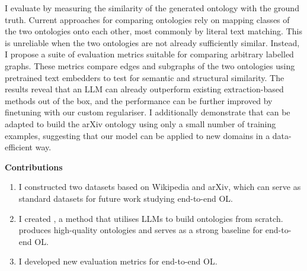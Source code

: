 I evaluate \name by measuring the similarity of the generated ontology with the ground truth. Current approaches for comparing ontologies rely on mapping classes of the two ontologies onto each other, most commonly by literal text matching.  This is unreliable when the two ontologies are not already sufficiently similar. Instead, I propose a suite of evaluation metrics suitable for comparing arbitrary labelled graphs. These metrics compare edges and subgraphs of the two ontologies using pretrained text embedders to test for semantic and structural similarity. The results reveal that an LLM can already outperform existing extraction-based methods out of the box, and the performance can be further improved by finetuning with our custom regulariser. I additionally demonstrate that \name can be adapted to build the arXiv ontology using only a small number of training examples, suggesting that our model can be applied to new domains in a data-efficient way.

\textbf{Contributions}
\begin{enumerate}
    \item I constructed two datasets based on Wikipedia and arXiv, which can serve as standard datasets for future work studying end-to-end OL.
    \item I created \name, a method that utilises LLMs to build ontologies from scratch. \name produces high-quality ontologies and serves as a strong baseline for end-to-end OL.
    \item I developed new evaluation metrics for end-to-end OL.
\end{enumerate}
